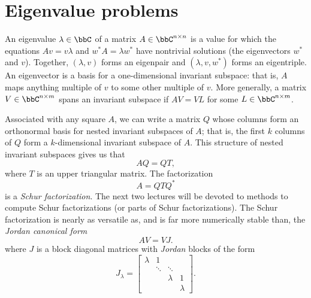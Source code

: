 \documentclass[12pt, leqno]{article}
\begin{document}

\section{Eigenvalue problems}

An eigenvalue $\lambda \in \bbC$ of a matrix $A \in \bbC^{n \times n}$
is a value for which the equations $A v = v \lambda$ and $w^* A = \lambda w^*$
have nontrivial
solutions (the eigenvectors $w^*$ and $v$).  Together, $(\lambda, v)$ forms an
eigenpair and $(\lambda, v, w^*)$ forms an eigentriple.
An eigenvector is a basis for a one-dimensional invariant
subspace: that is, $A$ maps anything multiple of $v$ to some other
multiple of $v$.  More generally, a matrix $V \in \bbC^{n \times m}$
spans an invariant subspace if $AV = VL$ for some
$L \in \bbC^{n \times m}$.

Associated with any square $A$, we can write a matrix $Q$ whose
columns form an orthonormal basis for nested invariant subspaces of
$A$; that is, the first $k$ columns of $Q$ form a $k$-dimensional
invariant subspace of $A$.  This structure of nested invariant
subspaces gives us that
\[
  AQ = QT,
\]
where $T$ is an upper triangular matrix.  The factorization
\[
  A = QTQ^*
\]
is a {\em Schur factorization}.  The next two lectures will be devoted to
methods to compute Schur factorizations (or parts of Schur
factorizations).  The Schur factorization is nearly as versatile as,
and is far more numerically stable than, the {\em Jordan canonical form}
\[
  A V = V J.
\]
where $J$ is a block diagonal matrices with
{\em Jordan} blocks of the form
\[
  J_{\lambda} =
  \begin{bmatrix}
    \lambda & 1  \\
            & \ddots & \ddots \\
            &        & \lambda & 1 \\
            &        &         & \lambda
  \end{bmatrix}.
\]
\end{document}
